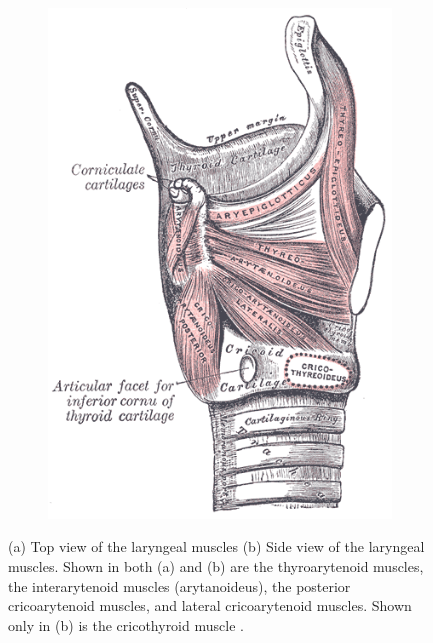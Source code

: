 \documentclass[12pt, letter]{report}
\begin{document}
\begin{figure}
\begin{subfigure}[b]{0.4\linewidth}
\includegraphics[width=\linewidth]{larynx_muscles_side.png}
\caption{}
\end{subfigure}
\caption{(a) Top view of the laryngeal muscles (b) Side view of the laryngeal
muscles. Shown in both (a) and (b) are the thyroarytenoid muscles, the
interarytenoid muscles (arytanoideus), the posterior cricoarytenoid muscles,
and lateral cricoarytenoid muscles. Shown only in (b) is the cricothyroid
muscle \cite{Gray2000Anatomy}.}
\label{fig:laryngeal_muscles}
\end{figure}
\end{document}
